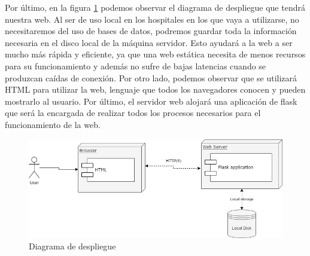 Por último, en la figura \ref{fig:deploy} podemos observar el diagrama de despliegue que tendrá nuestra web. Al ser de uso local en los hospitales en los que vaya a utilizarse, no necesitaremos del uso de bases de datos, podremos guardar toda la información necesaria en el disco local de la máquina servidor. Esto ayudará a la web a ser mucho más rápida y eficiente, ya que una web estática necesita de menos recursos para su funcionamiento y además no sufre de bajas latencias cuando se produzcan caídas de conexión. Por otro lado, podemos observar que se utilizará HTML para utilizar la web, lenguaje que todos los navegadores conocen y pueden mostrarlo al usuario. Por último, el servidor web alojará una aplicación de flask que será la encargada de realizar todos los procesos necesarios para el funcionamiento de la web.

\begin{figure}[H]
	\centering
	\includegraphics[width=1\textwidth]{images/diagramaDespliegueWeb.png}
	\caption{Diagrama de despliegue}
	\label{fig:deploy}
\end{figure}


\newpage